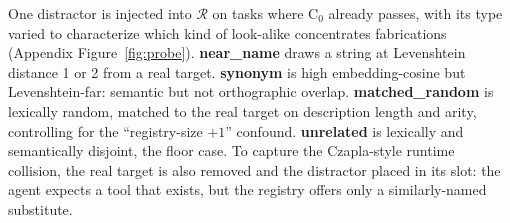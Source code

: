 One distractor is injected into $\mathcal{R}$ on tasks where $\mathrm{C}_0$ already passes, with its type varied to characterize which kind of look-alike concentrates fabrications (Appendix Figure~\ref{fig:probe}). \textbf{near\_name} draws a string at Levenshtein distance 1 or 2 from a real target. \textbf{synonym} is high embedding-cosine but Levenshtein-far: semantic but not orthographic overlap. \textbf{matched\_random} is lexically random, matched to the real target on description length and arity, controlling for the ``registry-size $+1$'' confound. \textbf{unrelated} is lexically and semantically disjoint, the floor case. To capture the Czapla-style runtime collision, the real target is also removed and the distractor placed in its slot: the agent expects a tool that exists, but the registry offers only a similarly-named substitute.
